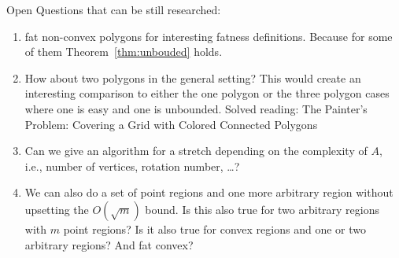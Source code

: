 \documentclass[a4paper,UKenglish,cleveref]{lipics-v2019}
\begin{document}
Open Questions that can be still researched:
\begin{enumerate}
	\item fat non-convex polygons for interesting fatness definitions. Because for some of them Theorem~\ref{thm:unbouded} holds.
	\item How about two polygons in the general setting? This would create an interesting comparison to either the one polygon or the three polygon cases where one is easy and one is unbounded.
	Solved reading: The Painter’s Problem: Covering a Grid with Colored Connected Polygons
	\item Can we give an algorithm for a stretch depending on the complexity of $A$, i.e., number of vertices, rotation number, \dots?
	\item We can also do a set of point regions and one more arbitrary region without upsetting the $O(\sqrt{m})$ bound. Is this also true for two arbitrary regions with $m$ point regions? Is it also true for convex regions and one or two arbitrary regions? And fat convex?
\end{enumerate}


\newpage
\appendix




\end{document}
